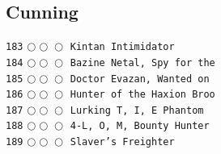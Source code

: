 \documentclass[a4paper,landscape]{article}
\begin{document}
\begin{multicols*}{5}
\section{Cunning} 
\vspace{-2mm} 
\texttt{183} \(\bigcirc\!\bigcirc\!\bigcirc\)  \texttt{Kintan Intimidator} \vspace{-0.3mm}\\ 
\texttt{184} \(\bigcirc\!\bigcirc\!\bigcirc\)  \texttt{Bazine Netal, Spy for the} \vspace{-0.3mm}\\ 
\texttt{185} \(\bigcirc\!\bigcirc\!\bigcirc\)  \texttt{Doctor Evazan, Wanted on } \vspace{-0.3mm}\\ 
\texttt{186} \(\bigcirc\!\bigcirc\!\bigcirc\)  \texttt{Hunter of the Haxion Broo} \vspace{-0.3mm}\\ 
\texttt{187} \(\bigcirc\!\bigcirc\!\bigcirc\)  \texttt{Lurking T, I, E Phantom} \vspace{-0.3mm}\\ 
\texttt{188} \(\bigcirc\!\bigcirc\!\bigcirc\)  \texttt{4-L, O, M, Bounty Hunter } \vspace{-0.3mm}\\ 
\texttt{189} \(\bigcirc\!\bigcirc\!\bigcirc\)  \texttt{Slaver’s Freighter} \vspace{-0.3mm}\\ 

\end{multicols*}
\end{document}
